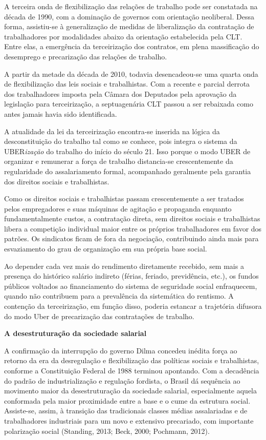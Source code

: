 A terceira onda de flexibilização das relações de trabalho pode ser
constatada na década de 1990, com a dominação de governos com orientação
neoliberal. Dessa forma, assistiu-se à generalização de medidas de
liberalização da contratação de trabalhadores por modalidades abaixo da
orientação estabelecida pela CLT. Entre elas, a emergência da
terceirização dos contratos, em plena massificação do desemprego e
precarização das relações de trabalho.

A partir da metade da década de 2010, todavia desencadeou-se uma quarta
onda de flexibilização das leis sociais e trabalhistas. Com a recente e
parcial derrota dos trabalhadores imposta pela Câmara dos Deputados pela
aprovação da legislação para terceirização, a septuagenária CLT passou a
ser rebaixada como antes jamais havia sido identificada.

A atualidade da lei da terceirização encontra-se inserida na lógica da
desconstituição do trabalho tal como se conhece, pois integra o sistema
da UBER\emph{ização} do trabalho do início do século 21. Isso porque o
modo UBER de organizar e remunerar a força de trabalho distancia-se
crescentemente da regularidade do assalariamento formal, acompanhado
geralmente pela garantia dos direitos sociais e trabalhistas.

Como os direitos sociais e trabalhistas passam crescentemente a ser
tratados pelos empregadores e suas máquinas de agitação e propaganda
enquanto fundamentalmente custos, a contratação direta, sem direitos
sociais e trabalhistas libera a competição individual maior entre os
próprios trabalhadores em favor dos patrões. Os sindicatos ficam de fora
da negociação, contribuindo ainda mais para esvaziamento do grau de
organização em sua própria base social.

Ao depender cada vez mais do rendimento diretamente recebido, sem mais a
presença do histórico salário indireto (férias, feriado, previdência,
etc.), os fundos públicos voltados ao financiamento do sistema de
seguridade social enfraquecem, quando não contribuem para a prevalência
da sistemática do rentismo. A contenção da terceirização, em função
disso, poderia estancar a trajetória difusora do modo Uber de
precarização das contratações de trabalho.

\textbf{A desestruturação da sociedade salarial }

A confirmação da interrupção do governo Dilma concedeu inédita força ao
retorno da era da desregulação e flexibilização das políticas sociais e
trabalhistas, conforme a Constituição Federal de 1988 terminou
apontando. Com a decadência do padrão de industrialização e regulação
fordista, o Brasil dá sequência ao movimento maior da desestruturação da
sociedade salarial, especialmente aquela conformada pela maior
proximidade entre a base e o cume da estrutura social. Assiste-se,
assim, à transição das tradicionais classes médias assalariadas e de
trabalhadores industriais para um novo e extensivo precariado, com
importante polarização social (Standing, 2013; Beck, 2000; Pochmann,
2012).

